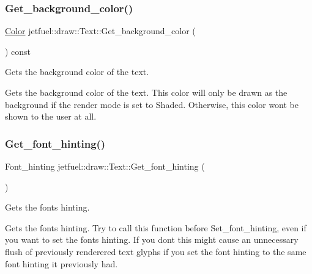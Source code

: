 \mbox{\label{classjetfuel_1_1draw_1_1Text_a47ce107c33da03675d39e7550f7c44fc}} 
\subsubsection{\texorpdfstring{Get\+\_\+background\+\_\+color()}{Get\_background\_color()}}
{\footnotesize\ttfamily \hyperlink{classjetfuel_1_1draw_1_1Color}{Color} jetfuel\+::draw\+::\+Text\+::\+Get\+\_\+background\+\_\+color (\begin{DoxyParamCaption}{ }\end{DoxyParamCaption}) const\hspace{0.3cm}{\ttfamily [inline]}}



Gets the background color of the text. 

Gets the background color of the text. This color will only be drawn as the background if the render mode is set to Shaded. Otherwise, this color won\textquotesingle{}t be shown to the user at all. \mbox{\label{classjetfuel_1_1draw_1_1Text_af9719fdfc0d04106843a69674df3d2c7}} 
\subsubsection{\texorpdfstring{Get\+\_\+font\+\_\+hinting()}{Get\_font\_hinting()}}
{\footnotesize\ttfamily Font\+\_\+hinting jetfuel\+::draw\+::\+Text\+::\+Get\+\_\+font\+\_\+hinting (\begin{DoxyParamCaption}{ }\end{DoxyParamCaption})\hspace{0.3cm}{\ttfamily [inline]}}



Gets the font\textquotesingle{}s hinting. 

Gets the font\textquotesingle{}s hinting. Try to call this function before Set\+\_\+font\+\_\+hinting, even if you want to set the font\textquotesingle{}s hinting. If you don\textquotesingle{}t this might cause an unnecessary flush of previously renderered text glyphs if you set the font hinting to the same font hinting it previously had. \mbox{\label{classjetfuel_1_1draw_1_1Text_a7d5f85f555e61f47a5a418399ba8e72b}} 
